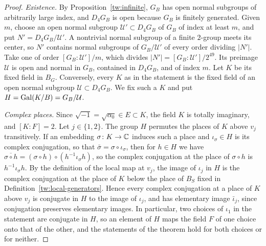 \begin{proof}
\emph{Existence.} By Proposition~\ref{tw:infinite}, $G_B$ has open normal
subgroups of arbitrarily large index, and $D_4G_B$ is open because $G_B$ is
finitely generated. Given $m$, choose an open normal subgroup
$\mathcal U'\subset D_4G_B$ of $G_B$ of index at least $m$, and put
$N'=D_4G_B/\mathcal U'$. A nontrivial normal subgroup of a finite $2$-group
meets its center, so $N'$ contains normal subgroups of $G_B/\mathcal U'$ of
every order dividing $|N'|$. Take one of order $[G_B:\mathcal U']/m$, which
divides $|N'|=[G_B:\mathcal U']/2^{49}$. Its preimage $\mathcal U$ is open and
normal in $G_B$, contained in $D_4G_B$, and of index $m$. Let $K$ be its fixed
field in $B_G$. Conversely, every $K$ as in the statement is the fixed field
of an open normal subgroup $\mathcal U\subset D_4G_B$. We fix such a $K$ and put
$H=\operatorname{Gal}(K/B)=G_B/\mathcal U$.

\emph{Complex places.} Since $\sqrt{-1}=\sqrt{\alpha_0}\in E\subset K$, the
field $K$ is totally imaginary, and $[K:F]=2$. Let $j\in\{1,2\}$. The group
$H$ permutes the places of $K$ above $v_j$ transitively. If an embedding
$\sigma\colon K\to\mathbb C$ induces such a place and $\iota_\sigma\in H$ is its
complex conjugation, so that $\bar\sigma=\sigma\circ\iota_\sigma$, then for
$h\in H$ we have
$\overline{\sigma\circ h}=(\sigma\circ h)\circ(h^{-1}\iota_\sigma h)$, so the
complex conjugation at the place of $\sigma\circ h$ is
$h^{-1}\iota_\sigma h$. By the definition of
the local map at $v_j$, the image of $\iota_j$ in $H$ is the complex
conjugation at the place of $K$ below the place of $B_S$ fixed in
Definition~\ref{tw:local-generators}. Hence every complex conjugation at a
place of $K$ above $v_j$ is conjugate in $H$ to the image of $\iota_j$, and
has elementary image $\bar\iota_j$, since conjugation preserves elementary
images. In particular, two choices of $\iota_1$ in the statement are
conjugate in $H$, so an element of $H$ maps the field $F$ of one choice onto
that of the other, and the statements of the theorem hold for both choices
or for neither.


\end{proof}

